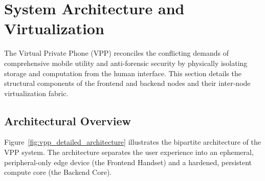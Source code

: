 \section{System Architecture and Virtualization}
\label{sec:architecture}

The Virtual Private Phone (VPP) reconciles the conflicting demands of comprehensive mobile utility and anti-forensic security by physically isolating storage and computation from the human interface. This section details the structural components of the frontend and backend nodes and their inter-node virtualization fabric.

\subsection{Architectural Overview}
Figure~\ref{fig:vpp_detailed_architecture} illustrates the bipartite architecture of the VPP system. The architecture separates the user experience into an ephemeral, peripheral-only edge device (the Frontend Handset) and a hardened, persistent compute core (the Backend Core).

